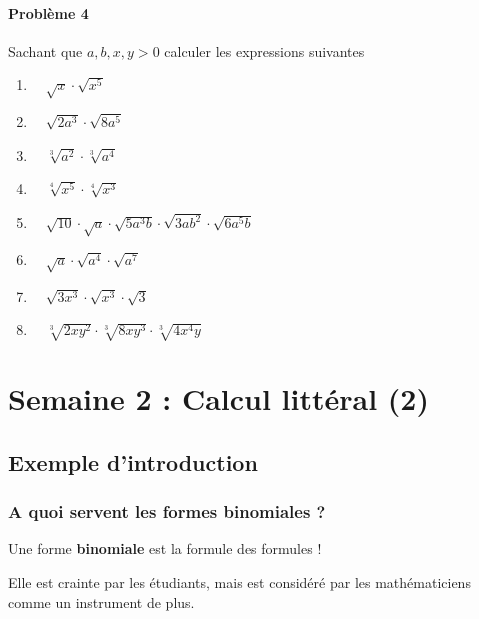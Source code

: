 \documentclass[
  12pt,
]{book}
\providecommand{\tightlist}{%
  \setlength{\itemsep}{0pt}\setlength{\parskip}{0pt}}
\begin{document}
\hypertarget{probluxe8me-4}{%
\subsubsection*{Problème 4}\label{probluxe8me-4}}

Sachant que \(a,b,x,y > 0\) calculer les expressions suivantes

\begin{enumerate}
\def\labelenumi{\arabic{enumi}.}
\tightlist
\item
  \(\quad \sqrt{x}\cdot\sqrt{x^5}\)
\item
  \(\quad \sqrt{2a^3}\cdot\sqrt{8a^5}\)
\item
  \(\quad \sqrt[3]{a^2}\cdot\sqrt[3]{a^4}\)
\item
  \(\quad \sqrt[4]{x^5}\cdot\sqrt[4]{x^3}\)
\item
  \(\quad \sqrt{10}\cdot\sqrt{a}\cdot\sqrt{5a^3b}\cdot\sqrt{3ab^2}\cdot\sqrt{6a^5b}\)
\item
  \(\quad \sqrt{a}\cdot\sqrt{a^4}\cdot\sqrt{a^7}\)
\item
  \(\quad \sqrt{3x^3}\cdot\sqrt{x^3}\cdot\sqrt{3}\)
\item
  \(\quad \sqrt[3]{2xy^2}\cdot\sqrt[3]{8xy^3}\cdot\sqrt[3]{4x^4y}\)
\end{enumerate}

\hypertarget{semaine-2-calcul-littuxe9ral-2}{%
\chapter{Semaine 2 : Calcul littéral (2)}\label{semaine-2-calcul-littuxe9ral-2}}

\hypertarget{exemple-dintroduction-1}{%
\section{Exemple d'introduction}\label{exemple-dintroduction-1}}

\hypertarget{a-quoi-servent-les-formes-binomiales}{%
\subsection{A quoi servent les formes binomiales ?}\label{a-quoi-servent-les-formes-binomiales}}

Une forme \textbf{binomiale} est la formule des formules !

Elle est crainte par les étudiants, mais est considéré par les mathématiciens comme un instrument de plus.
\end{document}
